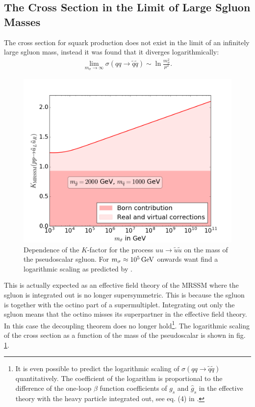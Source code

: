 \subsection{The Cross Section in the Limit of Large Sgluon Masses}
The cross section for squark production does not exist in the limit of an infinitely large sgluon mass, instead it was found that it diverges logarithmically:
\begin{align}
\lim_{m_{\sigma}\to\infty} \sigma(qq \to \tilde{q}\tilde{q}) \sim \ln \frac{m_{\sigma}^2}{\mu^2}.
\end{align}

\begin{figure}[H]
\begin{center}
\includegraphics[scale=.5]{figures/MRSSM_uu_susu_Kfactors_msq=1000GeV_msg=2000GeV.png}
\caption{Dependence of the $K$-factor for the process $uu \to \tilde{u}\tilde{u}$ on the mass of the pseudoscalar sgluon. For $m_{\sigma} \approx \unit[10^5]{GeV}$ onwards want find a logarithmic scaling as predicted by \cite{Cheng:1997sq}.}\label{fig:SgluonMassDependence}
\end{center}
\end{figure}
This is actually expected as an effective field theory of the MRSSM where the sgluon is integrated out is no longer supersymmetric. This is because the sgluon is together with the octino part of a supermultiplet. Integrating out only the sgluon means that the octino misses its superpartner in the effective field theory. In this case the decoupling theorem \cite{Appelquist:1974tg} does no longer hold\footnote{It is even possible to predict the  logarithmic scaling of $\sigma(qq \to \tilde{q}\tilde{q})$ quantitatively. The coefficient of the logarithm is proportional to the difference of the one-loop $\beta$ function coefficients of $g_s$ and $\hat{g}_s$ in the effective theory with the heavy particle integrated out, see eq. (4) in \cite{Cheng:1997sq}.}.
The logarithmic scaling of the cross section as a function of the mass of the pseudoscalar is shown in fig. \ref{fig:SgluonMassDependence}.

